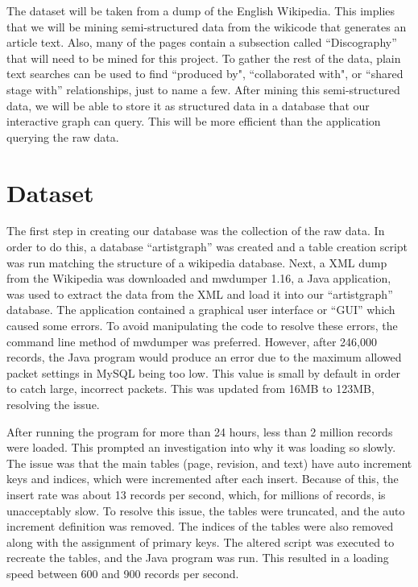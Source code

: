 \documentclass{sig-alternate}
\begin{document}
The dataset will be taken from a dump of the English Wikipedia. This implies 
that we will be mining semi-structured data from the wikicode that generates an 
article text. Also, many of the pages contain a subsection called ``Discography'' 
that will need to be mined for this project. To gather the rest of the data, 
plain text searches can be used to find ``produced by", ``collaborated with", 
or ``shared stage with'' relationships, just to name a few. After mining this 
semi-structured data, we will be able to store it as structured data in a database 
that our interactive graph can query. This will be more efficient than the 
application querying the raw data. 


\section{Dataset}
\label{dataset}

The first step in creating our database was the collection of the raw data.
In order to do this, a database ``artistgraph'' was created and a table creation
script was run matching the structure of a wikipedia database. Next, a XML dump from the Wikipedia was downloaded and
mwdumper 1.16, a Java application, was used to extract the data from the XML and load it
into our ``artistgraph'' database. The application contained a graphical user interface
or ``GUI'' which caused some errors. To avoid manipulating the code to resolve these errors,
the command line method of mwdumper was preferred. However, after 246,000 records, the 
Java program would produce an error due to the maximum allowed packet settings in MySQL
being too low. This value is small by default in order to catch large, incorrect packets.
This was updated from 16MB to 123MB, resolving the issue.

After running the program
for more than 24 hours, less than 2 million records were loaded. This prompted an 
investigation into why it was loading so slowly. The issue was that the main tables 
(page, revision, and text) have auto increment keys and indices, which were incremented after each insert.
Because of this, the insert rate was about 13 records per second, which, for
millions of records, is unacceptably slow. To resolve this issue, the tables
were truncated, and the auto increment definition was removed. The indices
of the tables were also removed along with the assignment of primary keys. The altered
script was executed to recreate the tables, and the Java program was run. This resulted
in a loading speed between 600 and 900 records per second. 
\end{document}

